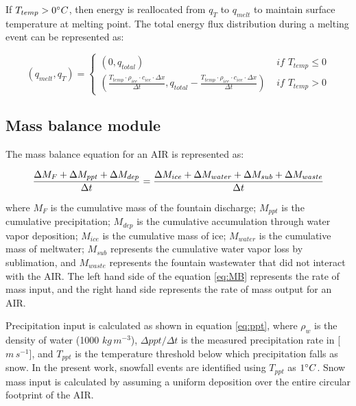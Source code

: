 If $T_{temp} > 0 ^{\circ} C$, then energy is reallocated from $q_{T}$ to $q_{melt}$ to maintain surface
temperature at melting point. The total energy flux distribution during a melting event can be represented as:

\begin{equation}
	(q_{melt}, q_{T}) = \left\{ \begin{array}{ll}
		(0, q_{total})
		                                                                                                                                                               & \textit{ if } T_{temp} \leq 0 \\
		(\frac{T_{temp} \cdot \rho_{ice} \cdot c_{ice} \cdot \Delta x}{\Delta t}, q_{total}-\frac{T_{temp} \cdot \rho_{ice} \cdot c_{ice} \cdot \Delta x}{\Delta t}  ) & \textit{ if } T_{temp} > 0
	\end{array} \right.
\end{equation}

\subsection{Mass balance module}

The mass balance equation for an AIR is represented as:

\begin{equation}
	\frac{\Delta M_{F} + \Delta M_{ppt} + \Delta M_{dep}}{\Delta t} = \frac{\Delta M_{ice} +\Delta M_{water} +
		\Delta M_{sub} + \Delta M_{waste}}{\Delta t}  \\
	\label{eq:MB}
\end{equation}

where $M_{F}$ is the cumulative mass of the fountain discharge; $M_{ppt}$ is the cumulative precipitation;  $M_{dep}$ is the cumulative
accumulation through water vapor deposition; $M_{ice}$ is the cumulative mass of ice; $M_{water}$ is the cumulative
mass of meltwater; $M_{sub}$ represents the cumulative water vapor loss by sublimation, and $M_{waste}$ represents the
fountain wastewater that did not interact with the AIR. The left hand side of the equation \ref{eq:MB} represents the rate of
mass input, and the right hand side represents the rate of mass output for an AIR.

Precipitation input is calculated as shown in equation \ref{eq:ppt}, where $\rho_{w}$ is the density of water (1000
$kg\,m^{-3}$), $\Delta ppt/ \Delta t$ is the measured precipitation rate in [$m\,s^{-1}$], and $T_{ppt}$ is the temperature threshold
below which precipitation falls as snow. In the present work, snowfall events are identified using $T_{ppt}$ as $1 ^{\circ} C$. Snow
mass input is calculated by assuming a uniform deposition over the entire circular footprint of the AIR.

